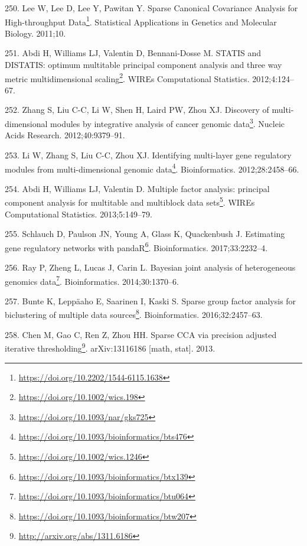 \documentclass[
  12pt,
  a4paper,
  twoside,
  openright]{book}
\DeclareRobustCommand{\href}[2]{#2\footnote{\url{#1}}}
\newlength{\cslhangindent}
\newlength{\cslentryspacingunit} %
\newenvironment{CSLReferences}[2] %
 {%
  \setlength{\parindent}{0pt}
  \ifodd #1
  \let\oldpar\par
  \def\par{\hangindent=\cslhangindent\oldpar}
  \fi
  \setlength{\parskip}{#2\cslentryspacingunit}
 }%
 {}
\begin{document}
\begin{CSLReferences}{0}{0}
\leavevmode{}%
250. Lee W, Lee D, Lee Y, Pawitan Y. \href{https://doi.org/10.2202/1544-6115.1638}{Sparse Canonical Covariance Analysis for High-throughput Data}. Statistical Applications in Genetics and Molecular Biology. 2011;10.

\leavevmode{}%
251. Abdi H, Williams LJ, Valentin D, Bennani-Dosse M. \href{https://doi.org/10.1002/wics.198}{STATIS and DISTATIS: optimum multitable principal component analysis and three way metric multidimensional scaling}. WIREs Computational Statistics. 2012;4:124--67.

\leavevmode{}%
252. Zhang S, Liu C-C, Li W, Shen H, Laird PW, Zhou XJ. \href{https://doi.org/10.1093/nar/gks725}{Discovery of multi-dimensional modules by integrative analysis of cancer genomic data}. Nucleic Acids Research. 2012;40:9379--91.

\leavevmode{}%
253. Li W, Zhang S, Liu C-C, Zhou XJ. \href{https://doi.org/10.1093/bioinformatics/bts476}{Identifying multi-layer gene regulatory modules from multi-dimensional genomic data}. Bioinformatics. 2012;28:2458--66.

\leavevmode{}%
254. Abdi H, Williams LJ, Valentin D. \href{https://doi.org/10.1002/wics.1246}{Multiple factor analysis: principal component analysis for multitable and multiblock data sets}. WIREs Computational Statistics. 2013;5:149--79.

\leavevmode{}%
255. Schlauch D, Paulson JN, Young A, Glass K, Quackenbush J. \href{https://doi.org/10.1093/bioinformatics/btx139}{Estimating gene regulatory networks with pandaR}. Bioinformatics. 2017;33:2232--4.

\leavevmode{}%
256. Ray P, Zheng L, Lucas J, Carin L. \href{https://doi.org/10.1093/bioinformatics/btu064}{Bayesian joint analysis of heterogeneous genomics data}. Bioinformatics. 2014;30:1370--6.

\leavevmode{}%
257. Bunte K, Leppäaho E, Saarinen I, Kaski S. \href{https://doi.org/10.1093/bioinformatics/btw207}{Sparse group factor analysis for biclustering of multiple data sources}. Bioinformatics. 2016;32:2457--63.

\leavevmode{}%
258. Chen M, Gao C, Ren Z, Zhou HH. \href{http://arxiv.org/abs/1311.6186}{Sparse CCA via precision adjusted iterative thresholding}. arXiv:13116186 {[}math, stat{]}. 2013.


\end{CSLReferences}
\end{document}
